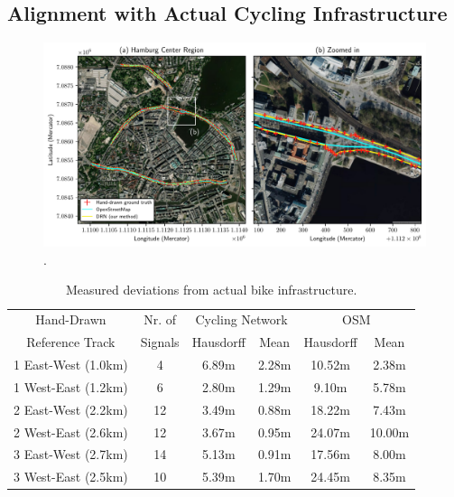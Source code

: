 \subsection{Alignment with Actual Cycling Infrastructure}

\begin{figure}[htbp]
\centering 
\includegraphics[width=\linewidth]{images/routing-hand-drawn-ground-truth.pdf}
\caption{.}
\label{fig:}
\end{figure}

\begin{table}[htbp]
\centering
\begin{tabular}{cccccc}
\hline
Hand-Drawn & Nr. of &\multicolumn{2}{c}{Cycling Network} & \multicolumn{2}{c}{OSM} \\
Reference Track & Signals & Hausdorff & Mean & Hausdorff & Mean \\ \hline
1 East-West ({1.0}{km}) & 4 & {6.89}{m} & {2.28}{m} & {10.52}{m} & {2.38}{m} \\
1 West-East ({1.2}{km}) & 6 &{2.80}{m} & {1.29}{m} & {9.10}{m} & {5.78}{m} \\
2 East-West ({2.2}{km}) & 12 & {3.49}{m} & {0.88}{m} & {18.22}{m} & {7.43}{m} \\
2 West-East ({2.6}{km}) & 12 & {3.67}{m} & {0.95}{m} & {24.07}{m}  & {10.00}{m} \\
3 East-West ({2.7}{km}) & 14 & {5.13}{m} & {0.91}{m} & {17.56}{m} & {8.00}{m} \\
3 West-East ({2.5}{km}) & 10 & {5.39}{m} & {1.70}{m} & {24.45}{m} & {8.35}{m} \\ \hline
\end{tabular}
\caption{Measured deviations from actual bike infrastructure.}%
\label{tab:accuracy-comparison}%
\end{table}

